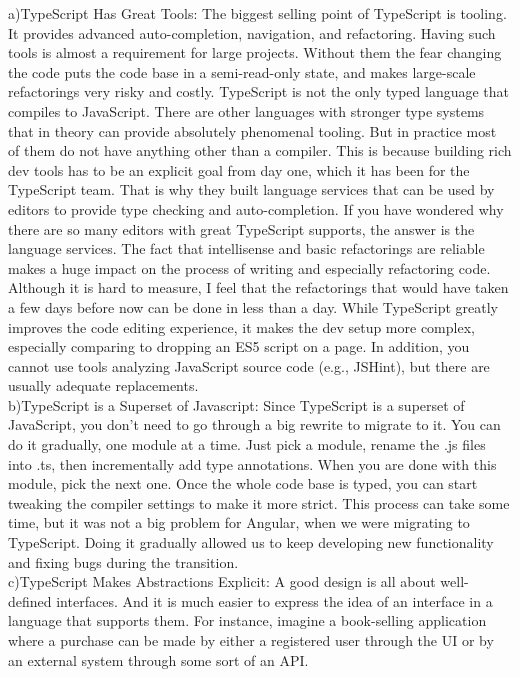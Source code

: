 \documentclass[10pt,journal,compsoc]{IEEEtran}
\begin{document}
\null\qquad a)TypeScript Has Great Tools: The biggest selling point of TypeScript is tooling. It provides advanced auto-completion, navigation, and refactoring. Having such tools is almost a requirement for large projects. Without them the fear changing the code puts the code base in a semi-read-only state, and makes large-scale refactorings very risky and costly. TypeScript is not the only typed language that compiles to JavaScript. There are other languages with stronger type systems that in theory can provide absolutely phenomenal tooling. But in practice most of them do not have anything other than a compiler. This is because building rich dev tools has to be an explicit goal from day one, which it has been for the TypeScript team. That is why they built language services that can be used by editors to provide type checking and auto-completion. If you have wondered why there are so many editors with great TypeScript supports, the answer is the language services. The fact that intellisense and basic refactorings are reliable makes a huge impact on the process of writing and especially refactoring code. Although it is hard to measure, I feel that the refactorings that would have taken a few days before now can be done in less than a day. While TypeScript greatly improves the code editing experience, it makes the dev setup more complex, especially comparing to dropping an ES5 script on a page. In addition, you cannot use tools analyzing JavaScript source code (e.g., JSHint), but there are usually adequate replacements.\\

\null\qquad b)TypeScript is a Superset of Javascript: Since TypeScript is a superset of JavaScript, you don’t need to go through a big rewrite to migrate to it. You can do it gradually, one module at a time. Just pick a module, rename the .js files into .ts, then incrementally add type annotations. When you are done with this module, pick the next one. Once the whole code base is typed, you can start tweaking the compiler settings to make it more strict. This process can take some time, but it was not a big problem for Angular, when we were migrating to TypeScript. Doing it gradually allowed us to keep developing new functionality and fixing bugs during the transition.\\

\null\qquad c)TypeScript Makes Abstractions Explicit: A good design is all about well-defined interfaces. And it is much easier to express the idea of an interface in a language that supports them. For instance, imagine a book-selling application where a purchase can be made by either a registered user through the UI or by an external system through some sort of an API.
\end{document}
